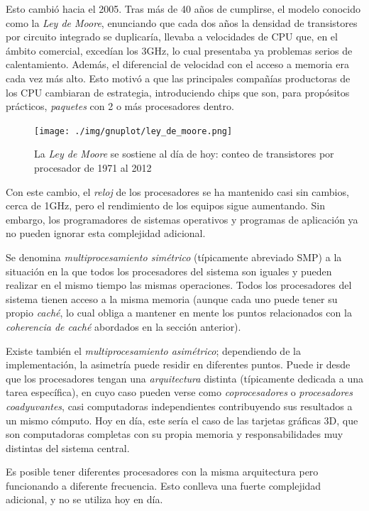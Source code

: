 \documentclass[11pt,fleqn]{book} %
\begin{document}
Esto cambió hacia el 2005. Tras más de 40 años de cumplirse, el modelo
conocido como la \emph{Ley de Moore}, enunciando que cada dos años la
densidad de transistores por circuito integrado se duplicaría,
llevaba a velocidades de CPU que, en el ámbito comercial, excedían los
3GHz, lo cual presentaba ya problemas serios de calentamiento. Además,
el diferencial de velocidad con el acceso a memoria era cada vez más
alto. Esto motivó a que las principales compañías productoras de los CPU
cambiaran de estrategia, introduciendo chips que son, para propósitos
prácticos, \emph{paquetes} con 2 o más procesadores dentro.

\begin{figure}[htb]
\centering
\texttt{[image: ./img/gnuplot/ley\_de\_moore.png]}
\caption{\label{HW_ley_de_moore}La \emph{Ley de Moore} se sostiene al día de hoy: conteo de transistores por procesador de 1971 al 2012}
\end{figure}

Con este cambio, el \emph{reloj} de los procesadores se ha mantenido casi
sin cambios, cerca de 1GHz, pero el rendimiento de los equipos sigue
aumentando. Sin embargo, los programadores de sistemas operativos y
programas de aplicación ya no pueden ignorar esta complejidad
adicional.

Se denomina \emph{multiprocesamiento simétrico} (típicamente abreviado SMP)
a la situación en la que todos los procesadores del sistema son
iguales y pueden realizar en el mismo tiempo las mismas
operaciones. Todos los procesadores del sistema tienen acceso a la
misma memoria (aunque cada uno puede tener su propio \emph{caché}, lo cual
obliga a mantener en mente los puntos relacionados con la \emph{coherencia de caché} abordados en la sección anterior).

Existe también el \emph{multiprocesamiento asimétrico}; dependiendo de la
implementación, la asimetría puede residir en diferentes puntos. Puede
ir desde que los procesadores tengan una \emph{arquitectura} distinta
(típicamente dedicada a una tarea específica), en cuyo caso 
pueden verse como \emph{coprocesadores} o \emph{procesadores coadyuvantes}, casi
computadoras independientes contribuyendo sus resultados a un mismo
cómputo. Hoy en día, este sería el caso de las tarjetas gráficas 3D,
que son computadoras completas con su propia memoria y
responsabilidades muy distintas del sistema central.

Es posible tener diferentes procesadores con la misma arquitectura
pero funcionando a diferente frecuencia. Esto conlleva una fuerte
complejidad adicional, y no se utiliza hoy en día.
\end{document}
